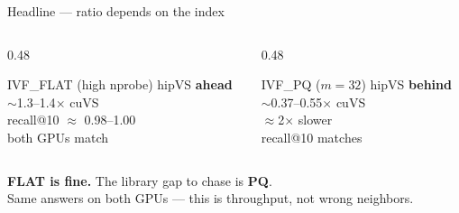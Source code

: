 \documentclass[aspectratio=169,11pt]{beamer}
\begin{document}
\begin{frame}{Headline --- ratio depends on the index}
  \begin{columns}[T]
    \begin{column}{0.48\textwidth}
      \begin{block}{IVF\_FLAT (high nprobe)}
        \centering\large
        hipVS \textbf{ahead}\\[0.35em]
        {\normalsize $\sim$1.3--1.4$\times$ cuVS}\\[0.25em]
        {\footnotesize recall@10 $\approx$ 0.98--1.00\\
         both GPUs match}
      \end{block}
    \end{column}
    \begin{column}{0.48\textwidth}
      \begin{block}{IVF\_PQ ($m{=}32$)}
        \centering\large
        hipVS \textbf{behind}\\[0.35em]
        {\normalsize $\sim$0.37--0.55$\times$ cuVS}\\[0.25em]
        {\footnotesize $\approx$2$\times$ slower\\
         recall@10 matches}
      \end{block}
    \end{column}
  \end{columns}

  \vspace{0.7em}
  \begin{center}
    \Large
    \textbf{FLAT is fine.} The library gap to chase is \textbf{PQ}.\\[0.35em]
    {\normalsize Same answers on both GPUs --- this is throughput, not wrong neighbors.}
  \end{center}
\end{frame}
\end{document}
